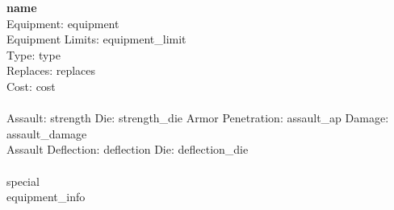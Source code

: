 {{\bf {name} }} \\
Equipment: {equipment} \\
Equipment Limits: {equipment_limit} \\
Type: {type} \\
Replaces: {replaces} \\
Cost: {cost}\\
\ \\
Assault: {strength} Die: {strength_die} Armor Penetration: {assault_ap} Damage: {assault_damage} \\
Assault Deflection: {deflection} Die: {deflection_die}\\
\ \\
{special}
\ \\
{equipment_info} 
\ \\

